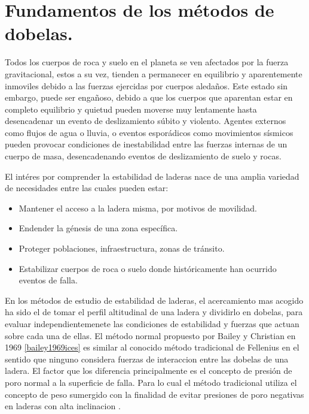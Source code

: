 \chapter{Fundamentos de los m\'etodos de dobelas.}

Todos los cuerpos de roca y suelo en el planeta se ven afectados por la fuerza gravitacional, estos a su vez, tienden a permanecer en equilibrio y aparentemente inmoviles debido a las fuerzas ejercidas por cuerpos aleda\~nos. Este estado sin embargo, puede ser enga\~noso, debido a que los cuerpos que aparentan estar en completo equilibrio y quietud pueden moverse muy lentamente hasta desencadenar un evento de deslizamiento s\'ubito y violento.
Agentes externos como flujos de agua o lluvia, o eventos espor\'adicos como movimientos s\'ismicos pueden provocar condiciones de inestabilidad entre las fuerzas internas de un cuerpo de masa, desencadenando eventos de deslizamiento de suelo y rocas.

El int\'eres por comprender la estabilidad de laderas nace de una amplia variedad de necesidades entre las cuales pueden estar:

\begin{itemize}
  \item Mantener el acceso a la ladera misma, por motivos de movilidad.
  \item Endender la g\'enesis de una zona espec\'ifica.
  \item Proteger poblaciones, infraestructura, zonas de tr\'ansito.
  \item Estabilizar cuerpos de roca o suelo donde hist\'oricamente han ocurrido eventos de falla.
\end{itemize}

En los m\'etodos de estudio de estabilidad de laderas, el acercamiento mas acogido ha sido el de tomar el  perfil altitudinal de una ladera y dividirlo en dobelas, para evaluar independientemenete las condiciones de estabilidad y fuerzas que actuan sobre cada una de ellas.
El m\'etodo normal propuesto por Bailey y Christian en 1969 \ref{bailey1969ices} es similar al conocido m\'etodo tradicional de Fellenius en el sentido que ninguno considera fuerzas de interaccion entre las dobelas de una ladera.
El factor que los diferencia principalmente es el concepto de presi\'on de poro normal a la superficie de falla. Para lo cual el m\'etodo tradicional utiliza el concepto de peso sumergido con la finalidad de evitar presiones de poro negativas en laderas con alta inclinacion        \cite{fredlund1977comparison}. 

